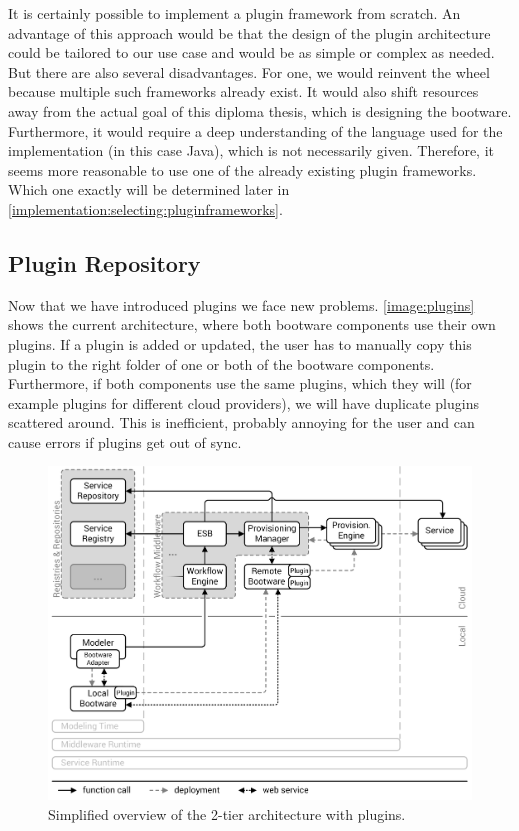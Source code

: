 It is certainly possible to implement a plugin framework from scratch.
An advantage of this approach would be that the design of the plugin architecture could be tailored to our use case and would be as simple or complex as needed.
But there are also several disadvantages.
For one, we would reinvent the wheel because multiple such frameworks already exist.
It would also shift resources away from the actual goal of this diploma thesis, which is designing the bootware.
Furthermore, it would require a deep understanding of the language used for the implementation (in this case Java), which is not necessarily given.
Therefore, it seems more reasonable to use one of the already existing plugin frameworks.
Which one exactly will be determined later in \autoref{implementation:selecting:pluginframeworks}.

\subsection{Plugin Repository}
\label{design:pluginrepository}

Now that we have introduced plugins we face new problems.
\autoref{image:plugins} shows the current architecture, where both bootware components use their own plugins.
If a plugin is added or updated, the user has to manually copy this plugin to the right folder of one or both of the bootware components.
Furthermore, if both components use the same plugins, which they will (for example plugins for different cloud providers), we will have duplicate plugins scattered around.
This is inefficient, probably annoying for the user and can cause errors if plugins get out of sync.

\begin{figure}[!htbp]
	\centering
	\includegraphics[resolution=600]{design/assets/plugins}
	\caption{Simplified overview of the 2-tier architecture with plugins.}
	\label{image:plugins}
\end{figure}


